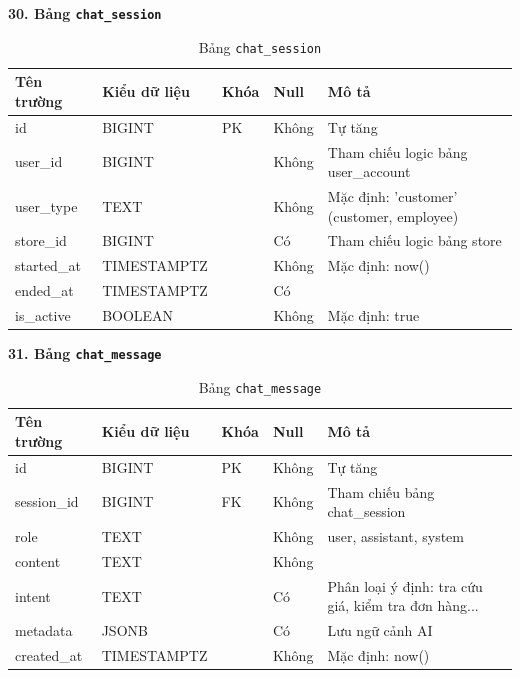 \documentclass[12pt,a4paper]{report}
\begin{document}
\vspace{0.3cm}
\textbf{30. Bảng \texttt{chat\_session}}
\vspace{0.1cm}
\begin{longtable}{|>{\ttfamily}p{3.5cm}|p{2.5cm}|p{1.5cm}|p{1.5cm}|p{5cm}|}
\caption{Bảng \texttt{chat\_session}} \label{tab:db_chat_session} \\
\hline
\normalfont\textbf{Tên trường} & \textbf{Kiểu dữ liệu} & \textbf{Khóa} & \textbf{Null} & \textbf{Mô tả} \\ \hline
id & BIGINT & PK & Không & Tự tăng \\ \hline
user\_id & BIGINT & & Không & Tham chiếu logic bảng user\_account \\ \hline
user\_type & TEXT & & Không & Mặc định: 'customer' (customer, employee) \\ \hline
store\_id & BIGINT & & Có & Tham chiếu logic bảng store \\ \hline
started\_at & TIMESTAMPTZ & & Không & Mặc định: now() \\ \hline
ended\_at & TIMESTAMPTZ & & Có & \\ \hline
is\_active & BOOLEAN & & Không & Mặc định: true \\ \hline
\end{longtable}

\vspace{0.3cm}
\textbf{31. Bảng \texttt{chat\_message}}
\vspace{0.1cm}
\begin{longtable}{|>{\ttfamily}p{3.5cm}|p{2.5cm}|p{1.5cm}|p{1.5cm}|p{5cm}|}
\caption{Bảng \texttt{chat\_message}} \label{tab:db_chat_message} \\
\hline
\normalfont\textbf{Tên trường} & \textbf{Kiểu dữ liệu} & \textbf{Khóa} & \textbf{Null} & \textbf{Mô tả} \\ \hline
id & BIGINT & PK & Không & Tự tăng \\ \hline
session\_id & BIGINT & FK & Không & Tham chiếu bảng chat\_session \\ \hline
role & TEXT & & Không & user, assistant, system \\ \hline
content & TEXT & & Không & \\ \hline
intent & TEXT & & Có & Phân loại ý định: tra cứu giá, kiểm tra đơn hàng... \\ \hline
metadata & JSONB & & Có & Lưu ngữ cảnh AI \\ \hline
created\_at & TIMESTAMPTZ & & Không & Mặc định: now() \\ \hline
\end{longtable}
\end{document}
